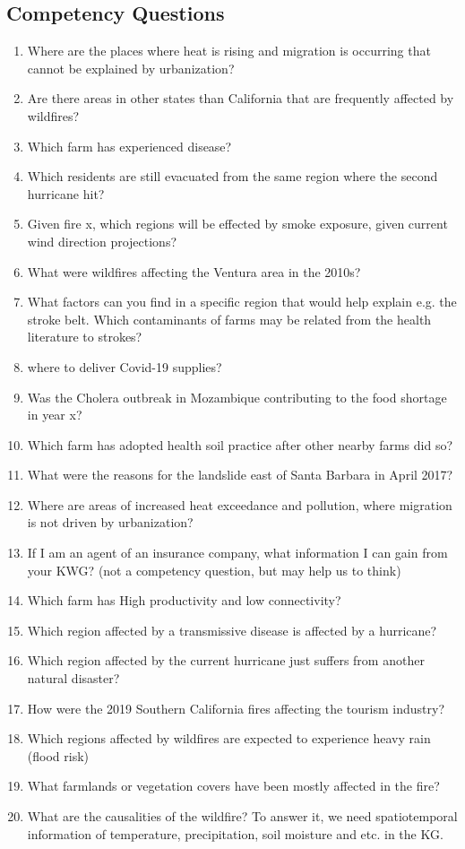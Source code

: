 \subsection{Competency Questions}
\label{ssec:cqs}
\begin{enumerate}[\phantom{CQ }CQ 1.]
	\item Where are the places where heat is rising and migration is occurring that cannot be explained by urbanization?
	\item Are there areas in other states than California that are frequently affected by wildfires?
	\item Which farm has experienced disease?
	\item Which residents are still evacuated from the same region where the second hurricane hit?
	\item Given fire x, which regions will be effected by smoke exposure, given current wind direction projections?
	\item What were wildfires affecting the Ventura area in the 2010s?
	\item What factors can you find in a specific region that would help explain e.g. the stroke belt. Which contaminants of farms may be related from the health literature to strokes?
	\item where to deliver Covid-19 supplies?
	\item Was the Cholera outbreak in Mozambique contributing to the food shortage in year x?
	\item Which farm has adopted health soil practice after other nearby farms did so?
	\item What were the reasons for the landslide east of Santa Barbara in April 2017?
	\item Where are areas of increased heat exceedance and pollution, where migration is not driven by urbanization?
	\item If I am an agent of an insurance company, what information I can gain from your KWG? (not a competency question, but may help us to think)
	\item Which farm has High productivity and low connectivity?
	\item Which region affected by a transmissive disease is affected by a hurricane?
	\item Which region affected by the current hurricane just suffers from another natural disaster?
	\item How were the 2019 Southern California fires affecting the tourism industry?
	\item Which regions affected by wildfires are expected to experience heavy rain (flood risk)
	\item What farmlands or vegetation covers have been mostly affected in the fire?
	\item What are the causalities of the wildfire? To answer it, we need spatiotemporal information of temperature, precipitation, soil moisture and etc. in the KG.
\end{enumerate}

